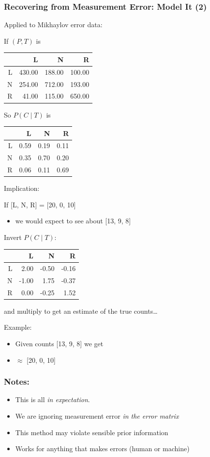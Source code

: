 \documentclass[11pt,compress,professionalfonts]{beamer}
\newcommand{\ita}{\begin{itemize}}
\newcommand{\itm}{\item[]}
\newcommand{\itz}{\end{itemize}}
\begin{document}
\begin{frame}[t]\frametitle{Recovering from Measurement Error: Model It (2)}

Applied to Mikhaylov error data:

If $(P, T)$ is

\begin{tabular}{rrrr}
\hline
& L & N & R \\
\hline
L & 430.00 & 188.00 & 100.00 \\
N & 254.00 & 712.00 & 193.00 \\
R & 41.00 & 115.00 & 650.00 \\
\hline
\end{tabular}

\newpage

So $P(C \mid T)$ is

\begin{tabular}{rrrr}
\hline
& L & N & R \\
\hline
L & 0.59 & 0.19 & 0.11 \\
N & 0.35 & 0.70 & 0.20 \\
R & 0.06 & 0.11 & 0.69 \\
\hline
\end{tabular}

Implication:

If [L, N, R] = [20, 0, 10]
\ita
\itm we would expect to see about [13, 9, 8]
\itz

\newpage
Invert $P(C \mid T)$:

\begin{tabular}{rrrr}
\hline
& L & N & R \\
\hline
L & 2.00 & -0.50 & -0.16 \\
N & -1.00 & 1.75 & -0.37 \\
R & 0.00 & -0.25 & 1.52 \\
\hline
\end{tabular}

and multiply to get an estimate of the true counts\ldots

Example:
\ita
\itm Given counts [13, 9, 8] we get
\itm [L 20.19, -0.16,  9.98] $\approx$ [20, 0, 10]
\itz

\end{frame}
\begin{frame}[t]\frametitle{Notes:}

\ita
\itm This is all \textit{in expectation}.
\itm We are ignoring measurement error \textit{in the error matrix}
\itm This method may violate sensible prior information
\itm Works for anything that makes errors (human or machine)
\itz

\end{frame}
\end{document}
